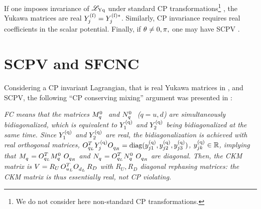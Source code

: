 \documentclass[12pt,a4paper]{article}
\begin{document}
If one imposes invariance of $\mathscr L_{\rm{Yq}}$ under standard CP transformations\footnote{We do not consider here non-standard CP transformations.} \cite{Branco:1999fs}, the Yukawa matrices are real $Y_{j}^{\rm (f)}=Y_{j}^{\rm (f)\ast}$. Similarly, CP invariance requires real coefficients in the scalar potential. Finally, if $\theta_{}\neq 0,\pi,$ one may have SCPV \cite{Branco:1980sz}.

\section{SCPV and SFCNC\label{SEC:SCPV:SFCNC}}
Considering a CP invariant Lagrangian, that is real Yukawa matrices in , and SCPV, the following ``CP conserving mixing'' argument was presented in \cite{Branco:1979pv}:

\emph{
FC means that the matrices $\wMatM{q}$ and $\wMatN{q}$ ($q=u,d$) are simultaneously bidiagonalized, which is equivalent to $Y_{1}^{\rm (q)}$ and $Y_{2}^{\rm (q)}$ being bidiagonalized at the same time. Since $Y_{1}^{\rm (q)}$ and $Y_{2}^{\rm (q)}$ are real, the bidiagonalization is achieved with real orthogonal matrices, $\MatOLt{q}\Yuk{j}{q}\MatOR{q}=\text{\rm diag}(\yuk{j1}{q},\yuk{j2}{q},\yuk{j3}{q})$, $y_{jk}^{\rm (q)}\in\mathbb{R}$, implying that $\MatM{q}=\MatOLt{q}\wMatM{q}\MatOR{q}$ and $\MatN{q}=\MatOLt{q}\wMatN{q}\MatOR{q}$ are diagonal. Then, the CKM matrix is $\CKM=R_U\,\OLUt\OLD\,R_D$ with $R_U,R_D$ diagonal rephasing matrices: the CKM matrix is thus essentially real, not CP violating.
}
\end{document}
